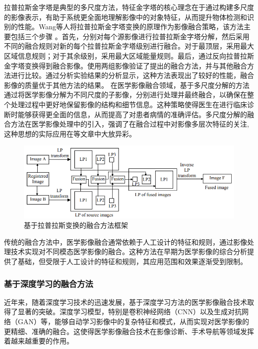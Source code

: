 拉普拉斯金字塔是典型的多尺度方法，特征金字塔的核心理念在于通过构建多尺度的影像表示，有助于系统更全面地理解影像中的对象特征，从而提升物体检测和识别的性能。Wang等人\cite{wang2011multi}将拉普拉斯金字塔变换的原理作为影像融合策略，该方法主要包括三个步骤
。首先，分别对每个源影像进行拉普拉斯金字塔分解，然后采用不同的融合规则对新的每个拉普拉斯金字塔级别进行融合。对于最顶层，采用最大区域信息规则；对于其余级别，采用最大区域能量规则。最后，通过反向拉普拉斯金字塔变换得到融合影像。使用两组影像验证了提出的融合方法，并与其他融合方法进行比较。通过分析实验结果的分析显示，这种方法表现出了较好的性能，融合影像的质量优于其他方法的结果。
在医学影像融合领域，基于多尺度分解的方法通过将医学影像分解为不同尺度的子影像，分别进行处理并最终融合，以确保在整个处理过程中更好地保留影像的结构和细节信息。这种策略使得医生在进行临床诊断时能够获得更全面的信息，从而提高了对患者病情的准确评估。多尺度分解的融合方法在医学影像处理中的引入，强调了在融合过程中对影像多层次特征的关注,这种思想的实际应用在\cite{sahu2014medical,mi2021medical,jiang2023lightweight}等文章中大放异彩。
   \begin{figure}[htbp]
      \centering
      \includegraphics[width=0.95\linewidth]{figs/LaplacianPyramid.png}
      \caption{基于拉普拉斯变换的融合方法框架}\label{Pyramidfusion}
    \end{figure}
  \fi

传统的融合方法中，医学影像融合通常依赖于人工设计的特征和规则，通过影像处理技术实现对不同模态医学影像的融合。这种方法在早期为医学影像的综合分析提供了基础，但受限于人工设计的特征和规则，其应用范围和效果逐渐受到限制。

\subsubsection{基于深度学习的融合方法}
近年来，随着深度学习技术的迅速发展，基于深度学习方法的医学影像融合技术\cite{rajalingam2018multimodal,liu2018deep,kaur2021multi,xia2019novel,zhou2023deep,rajalingam2022intelligent}取得了显著的突破。深度学习模型，特别是卷积神经网络（CNN）\cite{wang2020multi,el2021efficient,xia2019novel,li2021novel,zhang2023medical}以及生成对抗网络（GAN）\cite{zhou2023gan,huang2020mgmdcgan,ma2020ddcgan,wang2021dicyc}等，能够自动学习影像中的复杂特征和模式，从而实现对医学影像的更精细、准确的融合。这使得医学影像融合技术在影像诊断、手术导航等领域发挥着越来越重要的作用。

